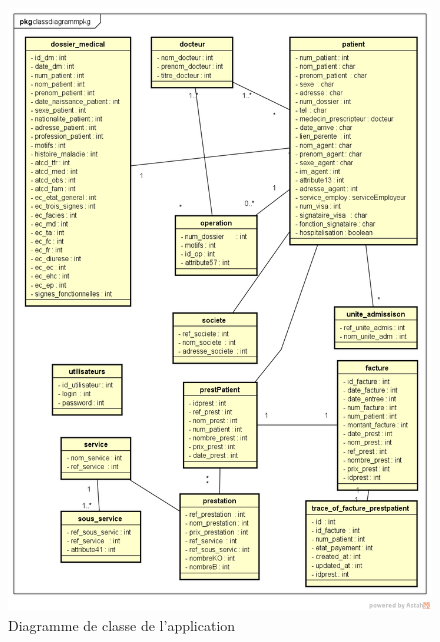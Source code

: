 	  \begin{figure}[h]
	  	  	  \includegraphics[scale=0.65]{Chapitre2/images/ClassDiagram0}
	  	  	  
	  	  	   
	  	  \caption{Diagramme de classe de l'application}
	  	  	  \end{figure}
	  
	  
	  
	  
	 
	  
	  
	  
	  